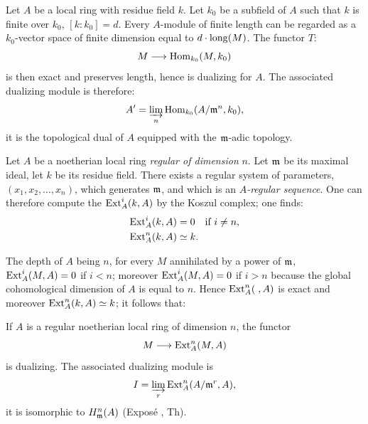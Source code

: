\begin{example}[Macaulay]
\label{IV.5.2} Let $A$ be a local ring with residue field $k$. Let $k_{0}$ be a subfield of $A$ such that $k$ is finite over $k_{0}$, $[k:k_{0}]=d$. Every $A$-module of finite length can be regarded as a $k_{0}$-vector space of finite dimension equal to $d\cdot\operatorname{long}(M)$. The functor $T$:
$$
M\to \Hom_{k_{0}}(M, k_{0})
$$
is then exact and preserves length, hence is dualizing for $A$. The associated dualizing module is therefore:
$$
A'=\varinjlim_{n}\operatorname{Hom}_{k_{0}}(A/\mathfrak{m}^{n}, k_{0}),
$$
it is the topological dual of $A$ equipped with the $\mathfrak{m}$-adic topology.
\end{example}

\begin{example} \label{IV.5.3}
Let $A$ be a noetherian local ring \emph{regular of dimension} $n$. Let $\mathfrak{m}$ be its maximal ideal, let $k$ be its residue field. There exists a regular system of parameters, $(x_{1}, x_{2}, \ldots, x_{n})$, which generates $\mathfrak{m}$, and which is an \emph{$A$-regular sequence}. One can therefore compute the $\operatorname{Ext}^{i}_{A}(k, A)$ by the Koszul complex; one finds:
\begin{align*}
\operatorname{Ext}^{i}_{A}(k, A)&=0\quad \text{if } i\neq n,\\
\operatorname{Ext}^{n}_{A}(k, A)&\simeq k.
\end{align*}

The depth of $A$ being $n$, for every $M$ annihilated by a power of $\mathfrak{m}$, $\operatorname{Ext}^{i}_{A}(M, A)=0$ if $i<n$; moreover $\operatorname{Ext}^{i}_{A}(M, A)=0$ if $i>n$ because the global cohomological dimension of $A$ is equal to $n$. Hence $\operatorname{Ext}^{n}_{A}(\;, A)$ is exact and moreover $\operatorname{Ext}^{n}_{A}(k, A)\simeq k$; it follows that:
\end{example}

\begin{proposition} \label{IV.5.4}
If $A$ is a regular noetherian local ring of dimension $n$, the functor
$$
M\to \Ext_{A}^{n}(M, A)
$$
is dualizing. The associated dualizing module is
$$
I=\varinjlim_{r}\operatorname{Ext}_{A}^{n}(A/\mathfrak{m}^{r}, A),
$$
it is isomorphic to $H^{n}_{\mathfrak{m}}(A)$ (Expos\'e , Th\ptbl {}).
\end{proposition}

